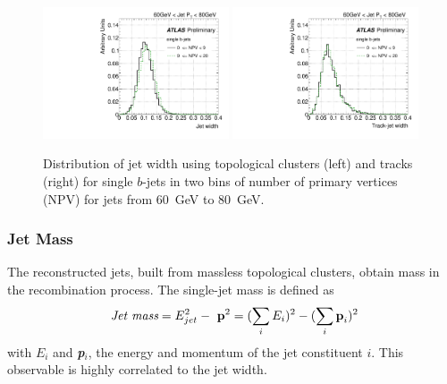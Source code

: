 \begin{figure}[tp]
\centering
\includegraphics[width=0.49\textwidth]{FIGS/systematics/Widthsingle_060.pdf}
\includegraphics[width=0.49\textwidth]{FIGS/systematics/trkWidthsingle_060.pdf}
\caption{Distribution of jet width using topological clusters (left) and tracks (right) for single $b$-jets in two bins of number of primary vertices (NPV) for jets from 60~GeV to 80~GeV.}
\label{fig:trkwidthpileup}
\end{figure}


\subsubsection{Jet Mass} 



 The reconstructed jets, built from massless topological clusters, obtain mass in the recombination process. The single-jet mass is defined as 
%
\begin{equation}
\mbox{ {\it Jet mass}} = E^2_{jet} - \mbox{ \emph{{\bf p}}}^2 = (\sum_i E_i)^2 - (\sum_i \mbox{\emph{{\bf p}}}_i)^2
\end{equation}
%
with  $E_i$ and \emph{\bf{p}}$_i$, the energy and momentum of the jet constituent $i$. This observable is highly correlated to the jet width.


